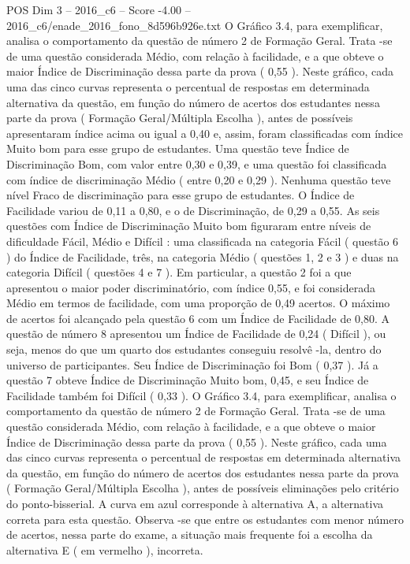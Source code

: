 \begin{textsample}{POS Dim 3 – 2016\_c6 – Score -4.00 – 2016\_c6/enade\_2016\_fono\_8d596b926e.txt}
O Gráfico 3.4, para exemplificar, analisa o comportamento da questão de número 2 de Formação Geral.
Trata -se de uma questão considerada Médio, com relação à facilidade, e a que obteve o maior Índice de Discriminação dessa parte da prova ( 0,55 ).
Neste gráfico, cada uma das cinco curvas representa o percentual de respostas em determinada alternativa da questão, em função do número de acertos dos estudantes nessa parte da prova ( Formação Geral/Múltipla Escolha ), antes de possíveis apresentaram índice acima ou igual a 0,40 e, assim, foram classificadas com índice Muito bom para esse grupo de estudantes.
Uma questão teve Índice de Discriminação Bom, com valor entre 0,30 e 0,39, e uma questão foi classificada com índice de discriminação Médio ( entre 0,20 e 0,29 ).
Nenhuma questão teve nível Fraco de discriminação para esse grupo de estudantes.
O Índice de Facilidade variou de 0,11 a 0,80, e o de Discriminação, de 0,29 a 0,55.
As seis questões com Índice de Discriminação Muito bom figuraram entre níveis de dificuldade Fácil, Médio e Difícil : uma classificada na categoria Fácil ( questão 6 ) do Índice de Facilidade, três, na categoria Médio ( questões 1, 2 e 3 ) e duas na categoria Difícil ( questões 4 e 7 ).
Em particular, a questão 2 foi a que apresentou o maior poder discriminatório, com índice 0,55, e foi considerada Médio em termos de facilidade, com uma proporção de 0,49 acertos.
O máximo de acertos foi alcançado pela questão 6 com um Índice de Facilidade de 0,80.
A questão de número 8 apresentou um Índice de Facilidade de 0,24 ( Difícil ), ou seja, menos do que um quarto dos estudantes conseguiu resolvê -la, dentro do universo de participantes.
Seu Índice de Discriminação foi Bom ( 0,37 ).
Já a questão 7 obteve Índice de Discriminação Muito bom, 0,45, e seu Índice de Facilidade também foi Difícil ( 0,33 ).
O Gráfico 3.4, para exemplificar, analisa o comportamento da questão de número 2 de Formação Geral.
Trata -se de uma questão considerada Médio, com relação à facilidade, e a que obteve o maior Índice de Discriminação dessa parte da prova ( 0,55 ).
Neste gráfico, cada uma das cinco curvas representa o percentual de respostas em determinada alternativa da questão, em função do número de acertos dos estudantes nessa parte da prova ( Formação Geral/Múltipla Escolha ), antes de possíveis eliminações pelo critério do ponto-bisserial.
A curva em azul corresponde à alternativa A, a alternativa correta para esta questão.
Observa -se que entre os estudantes com menor número de acertos, nessa parte do exame, a situação mais frequente foi a escolha da alternativa E ( em vermelho ), incorreta.

\end{textsample}
